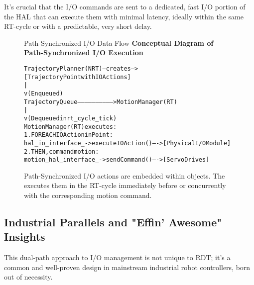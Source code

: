 It's crucial that the I/O commands are sent to a dedicated, fast I/O portion of the HAL that can execute them with minimal latency, ideally within the same RT-cycle or with a predictable, very short delay.

\begin{figure}[h!]
    \centering
    \begin{infobox}{Path-Synchronized I/O Data Flow}
        \textbf{Conceptual Diagram of Path-Synchronized I/O Execution}
        {\footnotesize
        \begin{alltt}
TrajectoryPlanner (NRT) --creates--> [TrajectoryPoint with IOActions]
                                                  |
                                                  v (Enqueued)
TrajectoryQueue ------------------------------> MotionManager (RT)
                                                  |
                                                  v (Dequeued in rt_cycle_tick)
MotionManager (RT) executes:
  1. FOR EACH IOAction in Point:
     hal_io_interface_->executeIOAction() ----> [Physical I/O Module]
  2. THEN, command motion:
     motion_hal_interface_->sendCommand() ----> [Servo Drives]
        \end{alltt}
        }
    \end{infobox}
           \vspace{0.3cm}
    \caption{Path-Synchronized I/O actions are embedded within  objects. The  executes them in the RT-cycle immediately before or concurrently with the corresponding motion command.}
    \label{fig:path_sync_io_flow}
\end{figure}


\subsection{Industrial Parallels and "Effin' Awesome" Insights}
\label{subsec:io_industrial_parallels}

This dual-path approach to I/O management is not unique to RDT; it's a common and well-proven design in mainstream industrial robot controllers, born out of necessity.

